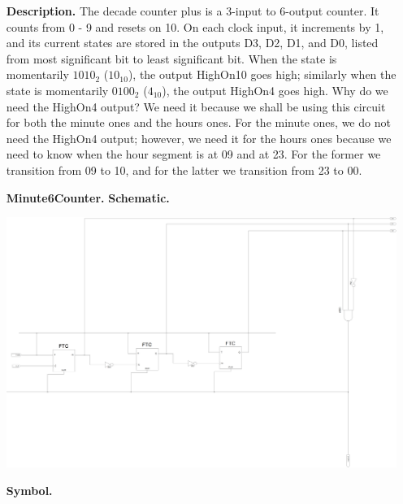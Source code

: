 \documentclass[9pt]{article}
\begin{document}
\begin{enumerate}
             \textbf{Description.} The decade counter plus is a 3-input to
             6-output counter. It counts from 0 - 9 and resets on 10. On each
             clock input, it increments by 1, and its current states are stored in
             the outputs D3, D2, D1, and D0, listed from most significant
             bit to least significant bit. When the state is momentarily
             $1010_2$ ($10_{10}$), the output HighOn10 goes high; similarly
             when the state is momentarily $0100_2$ ($4_{10}$), the output
             HighOn4 goes high. Why do we need the HighOn4 output? We need it
             because we shall be using this circuit for both the minute ones
             and the hours ones. For the minute ones, we do not need the
             HighOn4 output; however, we need it for the hours ones because
             we need to know when the hour segment is at 09 and at 23. For the
             former we transition from 09 to 10, and for the latter we
             transition from 23 to 00.
             
  	\item[\textbf{Minute6Counter.}] \textbf{Schematic.}
   
             \begin{center}
                \includegraphics[width=\textwidth]{minute_6_counter.png}
             \end{center}
             
             \newpage
             \textbf{Symbol.}
   

\end{enumerate}
\end{document}
